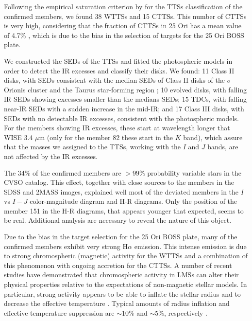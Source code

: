 \documentclass[12pt]{article}
\newcounter{subsubsubsection}[subsubsection]
\begin{document}
Following the empirical saturation criterion by \citet{BarradoYNavascues-Martin2003} for the TTSs classification of the confirmed members, we found 38 WTTSs and 15 CTTSs. This number of CTTSs is very high, considering that the fraction of CTTSs in 25 Ori has a mean value of 4.7\% \citep{Briceno2007,Downes2014}, which is due to the bias in the selection of targets for the 25 Ori BOSS plate.


We constructed the SEDs of the TTSs and fitted the photospheric \citet{Baraffe2015} models in order to detect the IR excesses and classify their disks. We found: 11 Class II disks, with SEDs consistent with the median SEDs of Class II disks of the $\sigma$ Orionis cluster \citep{Hernandez2007a} and the Taurus star-forming region \citep{Furlan2006}; 10 evolved disks, with falling IR SEDs showing excesses smaller than the medians SEDs; 15 TDCs, with falling near-IR SEDs with a sudden increase in the mid-IR; and 17 Class III disks, with SEDs with no detectable IR excesses, consistent with the photospheric \citet{Baraffe2015} models. For the members showing IR excesses, these start at wavelength longer that WISE 3.4 $\mu$m (only for the member 82 these start in the $K$ band), which assure that the masses we assigned to the TTSs, working with the $I$ and $J$ bands, are not affected by the IR excesses.

The 34\% of the confirmed members are $>99\%$ probability variable stars in the CVSO catalog. This effect, together with close sources to the members in the SDSS and 2MASS images, explained well most of the deviated members in the $I$ vs $I-J$ color-magnitude diagram and H-R diagrams. Only the position of the member 151 in the H-R diagrams, that appears younger that expected, seems to be real. Additional analysis are necessary to reveal the nature of this object.

Due to the bias in the target selection for the 25 Ori BOSS plate, many of the confirmed members exhibit very strong H$\alpha$ emission. This intense emission is due to strong chromospheric (magnetic) activity for the WTTSs and a combination of this phenomenon with ongoing accretion for the CTTSs. A number of recent studies have demonstrated that chromospheric activity in LMSs can alter their physical properties relative to the expectations of non-magnetic stellar models. In particular, strong activity appears to be able to inflate the stellar radius and to decrease the effective temperature \citep[e.g. ][]{Lopez-Morales2007,Morales2008}. Typical amounts of radius inflation and effective temperature suppression are $\sim$10\% and $\sim$5\%, respectively \citep{Lopez-Morales2007}.
\end{document}
